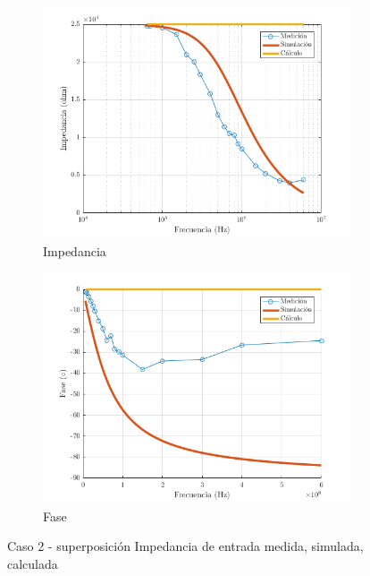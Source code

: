 \documentclass[../../main.tex]{subfiles}
\begin{document}
\begin{figure}[H]
\centering
\begin{subfigure}[http]{0.49\textwidth}
\includegraphics[width=\textwidth]{imagenes/z_n_r_c2.png}
\caption{Impedancia}\label{fig=znZc2}
\end{subfigure}
\begin{subfigure}[http]{0.49\textwidth}
\includegraphics[width=\textwidth]{imagenes/z_n_f_c2.png}
\caption{Fase} \label{fig=znFc2}
\end{subfigure}
\caption{Caso 2 - superposición Impedancia de entrada  medida, simulada, calculada}
\end{figure}
\end{document}

